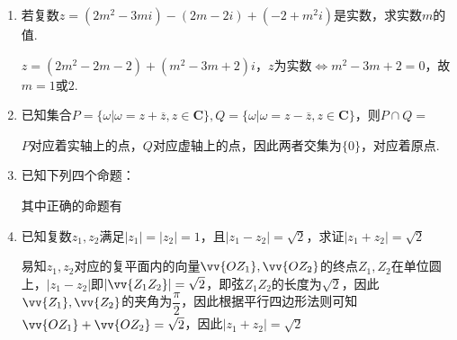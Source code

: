 \begin{enumerate}
    \item 若复数$z = (2m^2-3mi) - (2m-2i) + (-2+m^2i)$是实数，求实数$m$的值.
    \begin{jieda}
        $z = (2m^2-2m-2) + (m^2-3m+2)i$，$z$为实数$\Longleftrightarrow m^2-3m+2 = 0$，故$m = 1$或$2$.
    \end{jieda}
    \item 已知集合$P = \{\omega | \omega = z + \overline{z}, z \in \mathbf{C}\}, Q = \{\omega | \omega = z - \overline{z}, z \in \mathbf{C}\}$，则$P \cap Q =$
    \begin{jieda}
        $P$对应着实轴上的点，$Q$对应虚轴上的点，因此两者交集为$\{0\}$，对应着原点.
    \end{jieda}
    \item 已知下列四个命题：
    其中正确的命题有
    \begin{jieda}
    \end{jieda}
    \item 已知复数$z_1, z_2$满足$|z_1| = |z_2| = 1$，且$|z_1 - z_2| = \sqrt{2}$，求证$|z_1 + z_2| = \sqrt{2}$
    \begin{jieda}
        易知$z_1, z_2$对应的复平面内的向量$\vv{OZ_1}, \vv{OZ_2}$的终点$Z_1, Z_2$在单位圆上，$|z_1 - z_2|$即$|\vv{Z_1Z_2}| = \sqrt{2}$，即弦$Z_1Z_2$的长度为$\sqrt{2}$，因此$\vv{Z_1}, \vv{Z_2}$的夹角为$\dfrac{\pi}{2}$，因此根据平行四边形法则可知$\vv{OZ_1} + \vv{OZ_2} = \sqrt{2}$，因此$|z_1 + z_2| = \sqrt{2}$

\end{jieda}
\end{enumerate}
